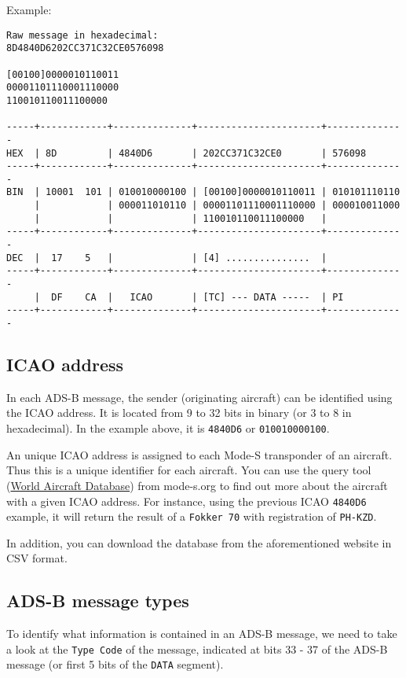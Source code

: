 Example:

\begin{verbatim}
Raw message in hexadecimal:
8D4840D6202CC371C32CE0576098

[00100]0000010110011
00001101110001110000
110010110011100000

-----+------------+--------------+----------------------+--------------
HEX  | 8D         | 4840D6       | 202CC371C32CE0       | 576098
-----+------------+--------------+----------------------+--------------
BIN  | 10001  101 | 010010000100 | [00100]0000010110011 | 010101110110
     |            | 000011010110 | 00001101110001110000 | 000010011000
     |            |              | 110010110011100000   |
-----+------------+--------------+----------------------+--------------
DEC  |  17    5   |              | [4] ...............  |
-----+------------+--------------+----------------------+--------------
     |  DF    CA  |   ICAO       | [TC] --- DATA -----  | PI
-----+------------+--------------+----------------------+--------------
\end{verbatim}

\subsection{ICAO address}\label{icao-address}

In each ADS-B message, the sender (originating aircraft) can be identified using the ICAO address. It is located from 9 to 32 bits in binary (or 3 to 8 in hexadecimal). In the example above, it is \texttt{4840D6} or \texttt{010010000100}.

An unique ICAO address is assigned to each Mode-S transponder of an aircraft. Thus this is a unique identifier for each aircraft. You can use the query tool (\href{https://junzis.com/adb/}{World Aircraft Database}) from mode-s.org to find out more about the aircraft with a given ICAO address. For instance, using the previous ICAO \texttt{4840D6} example, it will return the result of a \texttt{Fokker\ 70} with registration of \texttt{PH-KZD}.

In addition, you can download the database from the aforementioned website in CSV format.

\subsection{ADS-B message types}\label{ads-b-message-types}

To identify what information is contained in an ADS-B message, we need to take a look at the \texttt{Type\ Code} of the message, indicated at bits 33 - 37 of the ADS-B message (or first 5 bits of the \texttt{DATA} segment).

